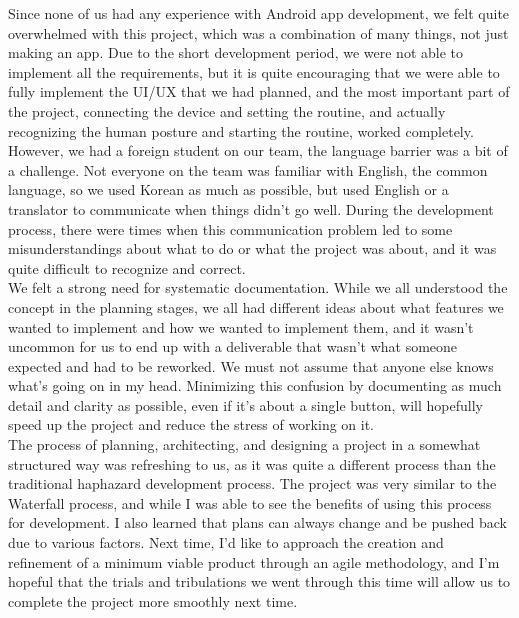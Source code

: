 Since none of us had any experience with Android app development, we felt quite overwhelmed with this project, which was a combination of many things, not just making an app. Due to the short development period, we were not able to implement all the requirements, but it is quite encouraging that we were able to fully implement the UI/UX that we had planned, and the most important part of the project, connecting the device and setting the routine, and actually recognizing the human posture and starting the routine, worked completely. \\

However, we had a foreign student on our team, the language barrier was a bit of a challenge. Not everyone on the team was familiar with English, the common language, so we used Korean as much as possible, but used English or a translator to communicate when things didn't go well. During the development process, there were times when this communication problem led to some misunderstandings about what to do or what the project was about, and it was quite difficult to recognize and correct.\\

We felt a strong need for systematic documentation. While we all understood the concept in the planning stages, we all had different ideas about what features we wanted to implement and how we wanted to implement them, and it wasn't uncommon for us to end up with a deliverable that wasn't what someone expected and had to be reworked. We must not assume that anyone else knows what's going on in my head. Minimizing this confusion by documenting as much detail and clarity as possible, even if it's about a single button, will hopefully speed up the project and reduce the stress of working on it.\\

The process of planning, architecting, and designing a project in a somewhat structured way was refreshing to us, as it was quite a different process than the traditional haphazard development process. The project was very similar to the Waterfall process, and while I was able to see the benefits of using this process for development. I also learned that plans can always change and be pushed back due to various factors. Next time, I'd like to approach the creation and refinement of a minimum viable product through an agile methodology, and I'm hopeful that the trials and tribulations we went through this time will allow us to complete the project more smoothly next time.\\

